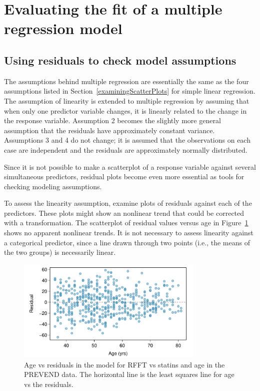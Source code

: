 \section{Evaluating the fit of a multiple regression model}

\subsection{Using residuals to check model assumptions}

The assumptions behind multiple regression are essentially the same as the four assumptions listed in Section~\ref{examiningScatterPlots} for simple linear regression. The assumption of linearity is extended to multiple regression by assuming that when only one predictor variable changes, it is linearly related to the change in the response variable.  Assumption 2 becomes the slightly more general assumption that the residuals have approximately constant variance. Assumptions 3 and 4 do not change; it is assumed that the observations on each case are independent and the residuals are approximately normally distributed.

Since it is not possible to make a scatterplot of a response variable against several simultaneous predictors, residual plots become even more essential as tools for checking modeling assumptions. 

To assess the linearity assumption, examine plots of residuals against each of the predictors. These plots might show an nonlinear trend that could be corrected with a transformation. The scatterplot of residual values versus age in Figure~\ref{prevendStatinAgeResidPlot} shows no apparent nonlinear trends. It is not necessary to assess linearity against a categorical predictor, since a line drawn through two points (i.e., the means of the two groups) is necessarily linear.

\begin{figure}[h!]
	\centering
	\includegraphics[width=0.8\textwidth]
	{ch_multiple_linear_regression_oi_biostat/figures/prevendStatinAgeResidPlot/prevendStatinAgeResidPlot.pdf}
	\caption{Age vs residuals in the model for RFFT vs statins and age in the PREVEND data.  The horizontal line is the least squares line for age vs the residuals.}
	\label{prevendStatinAgeResidPlot}
\end{figure}


